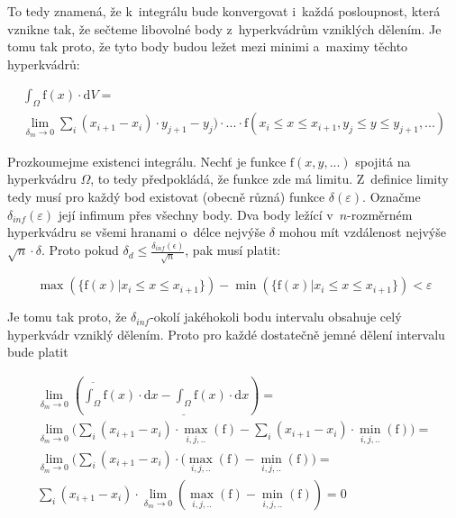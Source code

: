 To tedy znamená, že k~integrálu bude konvergovat i~každá posloupnost, která vznikne tak, že sečteme libovolné body z~hyperkvádrům vzniklých dělením. Je tomu tak proto, že tyto body budou ležet mezi minimi a~maximy těchto hyperkvádrů:

\begin{equation}
\begin{split}
\int_{\Omega} \mathrm{f}(x) \cdot \mathrm{d}V = \\
\lim_{\delta_m \to 0} \sum_{i} (x_{i+1} - x_i) \cdot y_{j+1} - y_j) \cdot ... \cdot \mathrm{f}(x_i \leq x \leq x_{i+1}, y_j \leq y \leq y_{j+1}, ...)
\end{split}
\end{equation}

Prozkoumejme existenci integrálu. Nechť je funkce \(\mathrm{f}(x, y, ...)\) spojitá na hyperkvádru \(\Omega\), to tedy předpokládá, že funkce zde má limitu. Z~definice limity tedy musí pro každý bod existovat (obecně různá) funkce \(\delta(\varepsilon)\). Označme \(\delta_{inf}(\varepsilon)\) její infimum přes všechny body. Dva body ležící v~\(n\)-rozměrném hyperkvádru se všemi hranami o~délce nejvýše \(\delta\) mohou mít vzdálenost nejvýše \(\sqrt{n} \cdot \delta\). Proto pokud \(\delta_d \leq \frac{\delta_{inf}(\epsilon)}{\sqrt{n}}\), pak musí platit: 

\begin{equation}
\max(\{\mathrm{f}(x) | x_i \leq x \leq x_{i+1}\}) - \min(\{\mathrm{f}(x) | x_i \leq x \leq x_{i+1}\}) < \varepsilon
\end{equation}

Je tomu tak proto, že \(\delta_{inf}\)-okolí jakéhokoli bodu intervalu obsahuje celý hyperkvádr vzniklý dělením. Proto pro každé dostatečně jemné dělení intervalu bude platit

\begin{equation}
\begin{split}
\lim_{\delta_m \to 0} \left( \overline{\int_{\Omega}} \mathrm{f}(x) \cdot \mathrm{d}x - \underline{\int_{\Omega}} \mathrm{f}(x) \cdot \mathrm{d}x \right) = \\
\lim_{\delta_m \to 0} \Bigg( \sum_{i} (x_{i+1} - x_i) \cdot \max_{i, j, ..}(\mathrm{f}) -
\sum_{i} (x_{i+1} - x_i) \cdot \min_{i, j, ..}(\mathrm{f}) \Bigg) = \\
\lim_{\delta_m \to 0} \Bigg( \sum_{i} (x_{i+1} - x_i) \cdot (\max_{i, j, ..}(\mathrm{f}) -
\min_{i, j, ..}(\mathrm{f}) \Bigg) = \\
\sum_{i} (x_{i+1} - x_i) \cdot \lim_{\delta_m \to 0} (\max_{i, j, ..}(\mathrm{f}) -
\min_{i, j, ..}(\mathrm{f})) = 0
\end{split}
\end{equation}

